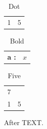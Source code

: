 \documentclass{article}
\begin{document}
\begin{longtable}{r@{.}l}
\caption{Dot}\label{t:a}\\
1 & 5 \\
\end{longtable}
\begin{longtable}{>{\bfseries}l<{:}>{$}l<{$}}
\caption{Bold} \\
a & x \\
\end{longtable}
\begin{longtable}{r@{.}l}
\caption{Five} 7\\
1 & 5 \\
\end{longtable}
After TEXT.
\end{document}
